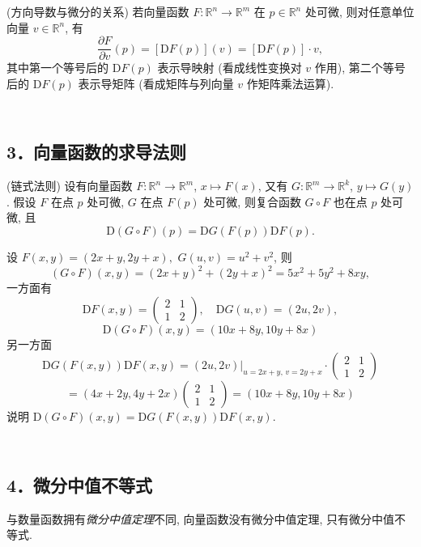 \begin{theorem}{(方向导数与微分的关系)}
若向量函数 $F:\mathbb{R}^{n}\rightarrow\mathbb{R}^{m}$ 在 $p\in\mathbb{R}^{n}$
处可微, 则对任意单位向量 $v\in\mathbb{R}^{n}$, 有
\[
\frac{\partial F}{\partial v}(p)=[\mathrm{D}F(p)](v)=[\mathrm{D}F(p)]\cdot v,
\]
其中第一个等号后的 $\mathrm{D}F(p)$ 表示导映射 (看成线性变换对 $v$ 作用), 第二个等号后的 $\mathrm{D}F(p)$
表示导矩阵 (看成矩阵与列向量 $v$ 作矩阵乘法运算).
\end{theorem}
\verb| |

\subsection{3．向量函数的求导法则}
\begin{theorem}{(链式法则)}
设有向量函数 $F:\mathbb{R}^{n}\rightarrow\mathbb{R}^{m}$, $x\mapsto F(x)$,
又有 $G:\mathbb{R}^{m}\rightarrow\mathbb{R}^{k}$, $y\mapsto G(y)$.
假设 $F$ 在点 $p$ 处可微, $G$ 在点 $F(p)$ 处可微, 则复合函数 $G\circ F$ 也在点 $p$
处可微, 且
\[
\mathrm{D}(G\circ F)(p)=\mathrm{D}G(F(p))\mathrm{D}F(p).
\]
\end{theorem}

\begin{example}{}
设 $F(x,y)=(2x+y,2y+x),$ $G(u,v)=u^{2}+v^{2}$, 则
\[
(G\circ F)(x,y)=(2x+y)^{2}+(2y+x)^{2}=5x^{2}+5y^{2}+8xy,
\]
一方面有 
$$
\mathrm{D}F(x,y)=\left(\begin{array}{cc}
2& 1\\
1 & 2
\end{array}\right),\quad\mathrm{D}G(u,v)=(2u,2v),
$$
\[
\mathrm{D}(G\circ F)(x,y)=(10x+8y,10y+8x)
\]
另一方面 
$$
\mathrm{D}G(F(x,y))\mathrm{D}F(x,y)  =  \left.(2u,2v)\right|_{u=2x+y,\,v=2y+x}\cdot\left(\begin{array}{cc}
2 & 1\\
1 & 2
\end{array}\right)
$$
$$
  =  (4x+2y,4y+2x)\left(\begin{array}{cc}
2 & 1\\
1 & 2
\end{array}\right)
  =  (10x+8y,10y+8x)
$$
 说明 $\mathrm{D}(G\circ F)(x,y)=\mathrm{D}G(F(x,y))\mathrm{D}F(x,y)$. 
\end{example}
\verb| |

\subsection{4．微分中值不等式}
与数量函数拥有\textsl{微分中值定理}不同, 向量函数没有微分中值定理, 只有微分中值不等式. 

